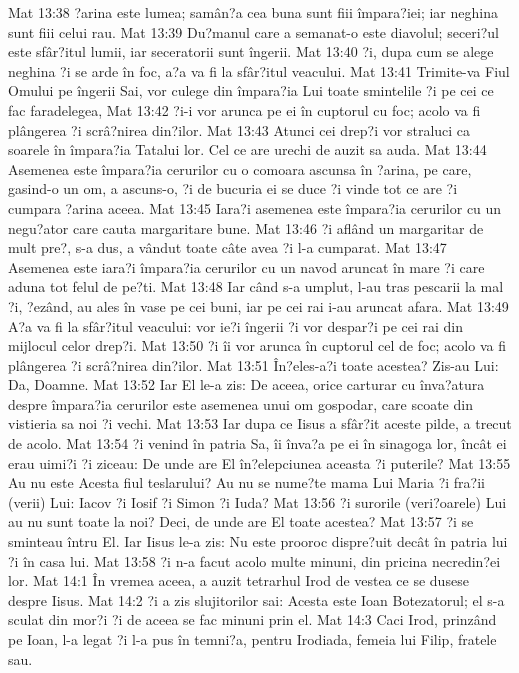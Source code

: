 Mat 13:38  ?arina este lumea; samân?a cea buna sunt fiii împara?iei; iar neghina sunt fiii celui rau.
Mat 13:39  Du?manul care a semanat-o este diavolul; seceri?ul este sfâr?itul lumii, iar seceratorii sunt îngerii.
Mat 13:40  ?i, dupa cum se alege neghina ?i se arde în foc, a?a va fi la sfâr?itul veacului.
Mat 13:41  Trimite-va Fiul Omului pe îngerii Sai, vor culege din împara?ia Lui toate smintelile ?i pe cei ce fac faradelegea,
Mat 13:42  ?i-i vor arunca pe ei în cuptorul cu foc; acolo va fi plângerea ?i scrâ?nirea din?ilor.
Mat 13:43  Atunci cei drep?i vor straluci ca soarele în împara?ia Tatalui lor. Cel ce are urechi de auzit sa auda.
Mat 13:44  Asemenea este împara?ia cerurilor cu o comoara ascunsa în ?arina, pe care, gasind-o un om, a ascuns-o, ?i de bucuria ei se duce ?i vinde tot ce are ?i cumpara ?arina aceea.
Mat 13:45  Iara?i asemenea este împara?ia cerurilor cu un negu?ator care cauta margaritare bune.
Mat 13:46  ?i aflând un margaritar de mult pre?, s-a dus, a vândut toate câte avea ?i l-a cumparat.
Mat 13:47  Asemenea este iara?i împara?ia cerurilor cu un navod aruncat în mare ?i care aduna tot felul de pe?ti.
Mat 13:48  Iar când s-a umplut, l-au tras pescarii la mal ?i, ?ezând, au ales în vase pe cei buni, iar pe cei rai i-au aruncat afara.
Mat 13:49  A?a va fi la sfâr?itul veacului: vor ie?i îngerii ?i vor despar?i pe cei rai din mijlocul celor drep?i.
Mat 13:50  ?i îi vor arunca în cuptorul cel de foc; acolo va fi plângerea ?i scrâ?nirea din?ilor.
Mat 13:51  În?eles-a?i toate acestea? Zis-au Lui: Da, Doamne.
Mat 13:52  Iar El le-a zis: De aceea, orice carturar cu înva?atura despre împara?ia cerurilor este asemenea unui om gospodar, care scoate din vistieria sa noi ?i vechi.
Mat 13:53  Iar dupa ce Iisus a sfâr?it aceste pilde, a trecut de acolo.
Mat 13:54  ?i venind în patria Sa, îi înva?a pe ei în sinagoga lor, încât ei erau uimi?i ?i ziceau: De unde are El în?elepciunea aceasta ?i puterile?
Mat 13:55  Au nu este Acesta fiul teslarului? Au nu se nume?te mama Lui Maria ?i fra?ii (verii) Lui: Iacov ?i Iosif ?i Simon ?i Iuda?
Mat 13:56  ?i surorile (veri?oarele) Lui au nu sunt toate la noi? Deci, de unde are El toate acestea?
Mat 13:57  ?i se sminteau întru El. Iar Iisus le-a zis: Nu este prooroc dispre?uit decât în patria lui ?i în casa lui.
Mat 13:58  ?i n-a facut acolo multe minuni, din pricina necredin?ei lor.
Mat 14:1  În vremea aceea, a auzit tetrarhul Irod de vestea ce se dusese despre Iisus.
Mat 14:2  ?i a zis slujitorilor sai: Acesta este Ioan Botezatorul; el s-a sculat din mor?i ?i de aceea se fac minuni prin el.
Mat 14:3  Caci Irod, prinzând pe Ioan, l-a legat ?i l-a pus în temni?a, pentru Irodiada, femeia lui Filip, fratele sau.

